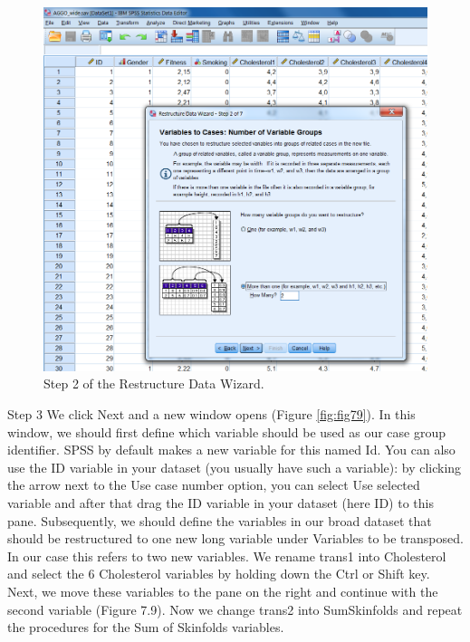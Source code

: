 \documentclass[
]{book}
\begin{document}
\begin{figure}

{\centering \includegraphics[width=0.9\linewidth]{images/fig7.8} 

}

\caption{Step 2 of the Restructure Data Wizard.}\label{fig:fig78}
\end{figure}

Step 3
We click Next and a new window opens (Figure \ref{fig:fig79}). In this window, we should first define which variable should be used as our case group identifier. SPSS by default makes a new variable for this named Id. You can also use the ID variable in your dataset (you usually have such a variable): by clicking the arrow next to the Use case number option, you can select Use selected variable and after that drag the ID variable in your dataset (here ID) to this pane. Subsequently, we should define the variables in our broad dataset that should be restructured to one new long variable under Variables to be transposed. In our case this refers to two new variables. We rename trans1 into Cholesterol and select the 6 Cholesterol variables by holding down the Ctrl or Shift key. Next, we move these variables to the pane on the right and continue with the second variable (Figure 7.9). Now we change trans2 into SumSkinfolds and repeat the procedures for the Sum of Skinfolds variables.
\end{document}
